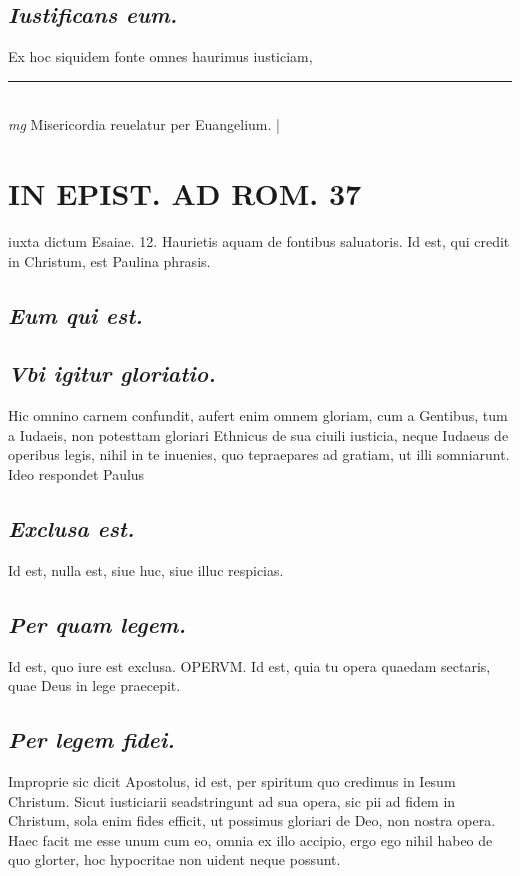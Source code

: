 \documentclass{article}
\begin{document}
\begin{pages}
\subsection*{\textit{Iustificans eum. }}\pstart Ex hoc siquidem fonte omnes haurimus iusticiam,  \pend
\vspace{0.5cm}\noindent
\vspace{0.2cm}\rule{1cm}{0.2pt}\\ 
\hspace{0.2cm}\textit{mg}
\footnotesize Misericordia reuelatur per Euangelium.  
\normalsize| 
\section*{IN EPIST. AD ROM.  37 }
\marginpar{[ p.]}\pstart iuxta dictum Esaiae. 12. Haurietis aquam de fontibus saluatoris.   \pend\pstart Id est, qui credit in Christum, est Paulina phrasis.   \pend
{}
{}
\subsection*{\textit{Eum qui est. }}
{}
\subsection*{\textit{Vbi igitur gloriatio.  }}\pstart Hic omnino carnem confundit, aufert enim omnem gloriam, cum a Gentibus, tum a Iudaeis, non potesttam gloriari Ethnicus de sua ciuili iusticia, neque Iudaeus de operibus legis, nihil in te inuenies, quo tepraepares ad gratiam, ut illi somniarunt. Ideo respondet Paulus  \pend
{}
{}
\subsection*{\textit{Exclusa est. }}\pstart Id est, nulla est, siue huc, siue illuc respicias.   \pend
{}
{}
\subsection*{\textit{Per quam legem. }}\pstart Id est, quo iure est exclusa. OPERVM.  Id est, quia tu opera quaedam sectaris, quae Deus in lege praecepit.  \pend
{}
{}
\subsection*{\textit{Per legem fidei. }}\pstart Improprie sic dicit Apostolus, id est, per spiritum quo credimus in Iesum Christum. Sicut iusticiarii seadstringunt ad sua opera, sic pii ad fidem in Christum, sola enim fides efficit, ut possimus gloriari de Deo, non nostra opera. Haec facit me esse unum cum eo, omnia ex illo accipio, ergo ego nihil habeo de quo glorter, hoc hypocritae non uident neque possunt.  \pend

\end{pages}
\end{document}
